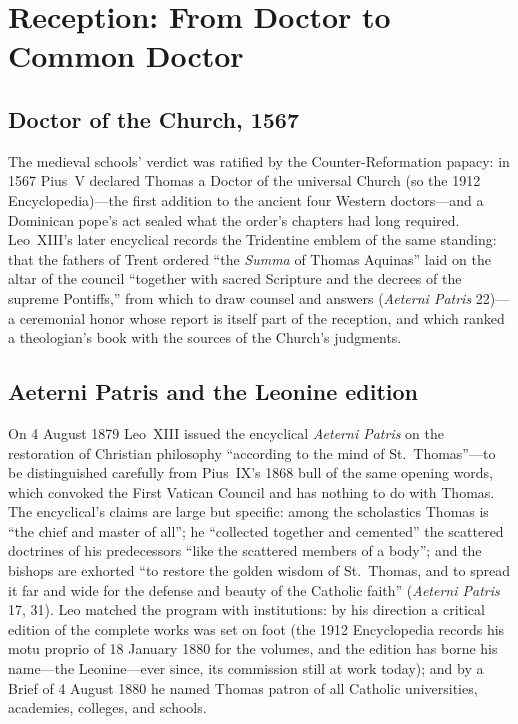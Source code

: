 \section{Reception: From Doctor to Common Doctor}

\subsection{Doctor of the Church, 1567}

The medieval schools' verdict was ratified by the Counter-Reformation
papacy: in 1567 Pius~V declared Thomas a Doctor of the universal Church
(so the 1912 Encyclopedia)---the first addition to the ancient four
Western doctors---and a Dominican pope's act sealed what the order's
chapters had long required. Leo~XIII's later encyclical records the
Tridentine emblem of the same standing: that the fathers of Trent
ordered ``the \textit{Summa} of Thomas Aquinas'' laid on the altar of
the council ``together with sacred Scripture and the decrees of the
supreme Pontiffs,'' from which to draw counsel and answers
(\textit{Aeterni Patris} 22)---a ceremonial honor whose report is
itself part of the reception, and which ranked a theologian's book with
the sources of the Church's judgments.

\subsection{Aeterni Patris and the Leonine edition}

On 4 August 1879 Leo~XIII issued the encyclical \textit{Aeterni Patris}
on the restoration of Christian philosophy ``according to the mind of
St.~Thomas''---to be distinguished carefully from Pius~IX's 1868 bull of
the same opening words, which convoked the First Vatican Council and has
nothing to do with Thomas. The encyclical's claims are large but
specific: among the scholastics Thomas is ``the chief and master of
all''; he ``collected together and cemented'' the scattered doctrines of
his predecessors ``like the scattered members of a body''; and the
bishops are exhorted ``to restore the golden wisdom of St.~Thomas, and
to spread it far and wide for the defense and beauty of the Catholic
faith'' (\textit{Aeterni Patris} 17, 31). Leo matched the program with
institutions: by his direction a critical edition of the complete works
was set on foot (the 1912 Encyclopedia records his motu proprio of 18
January 1880 for the  volumes, and the edition
has borne his name---the Leonine---ever since, its commission still at
work today); and by a Brief of 4 August 1880 he named Thomas patron of
all Catholic universities, academies, colleges, and schools.

